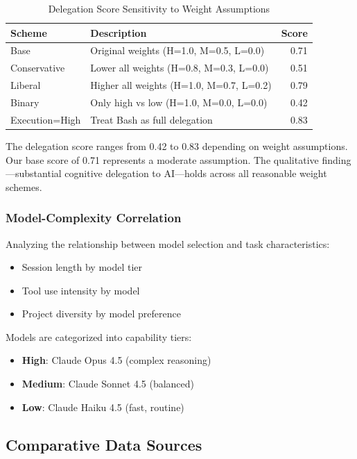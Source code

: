 \documentclass{ntlabs-preprint}
\begin{document}
\begin{table}[h]
\centering
\caption{Delegation Score Sensitivity to Weight Assumptions}
\label{tab:sensitivity}
\begin{tabular}{llr}
\toprule
\textbf{Scheme} & \textbf{Description} & \textbf{Score} \\
\midrule
Base & Original weights (H=1.0, M=0.5, L=0.0) & 0.71 \\
Conservative & Lower all weights (H=0.8, M=0.3, L=0.0) & 0.51 \\
Liberal & Higher all weights (H=1.0, M=0.7, L=0.2) & 0.79 \\
Binary & Only high vs low (H=1.0, M=0.0, L=0.0) & 0.42 \\
Execution=High & Treat Bash as full delegation & 0.83 \\
\bottomrule
\end{tabular}
\end{table}

The delegation score ranges from 0.42 to 0.83 depending on weight assumptions. Our base score of 0.71 represents a moderate assumption. The qualitative finding---substantial cognitive delegation to AI---holds across all reasonable weight schemes.

\subsubsection{Model-Complexity Correlation}

Analyzing the relationship between model selection and task characteristics:
\begin{itemize}
    \item Session length by model tier
    \item Tool use intensity by model
    \item Project diversity by model preference
\end{itemize}

Models are categorized into capability tiers:
\begin{itemize}
    \item \textbf{High}: Claude Opus 4.5 (complex reasoning)
    \item \textbf{Medium}: Claude Sonnet 4.5 (balanced)
    \item \textbf{Low}: Claude Haiku 4.5 (fast, routine)
\end{itemize}

\subsection{Comparative Data Sources}
\end{document}
